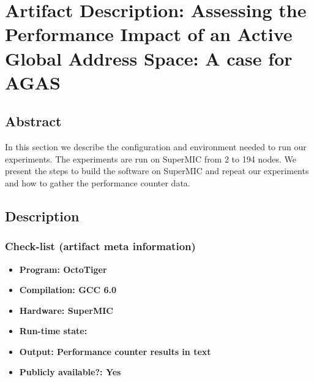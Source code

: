 \section{Artifact Description: Assessing the Performance Impact of an Active Global Address Space: A case for AGAS}


\subsection{Abstract}

In this section we describe the configuration and environment needed to run our experiments. The experiments are run on SuperMIC\cite{smic_info} from 2 to 194 nodes. We present the steps to build the software on SuperMIC and repeat our experiments and how to gather the performance counter data.

\subsection{Description}

\subsubsection{Check-list (artifact meta information)}


{\small
\begin{itemize}
  \item {\bf Program: OctoTiger}
  \item {\bf Compilation: GCC 6.0}
  \item {\bf Hardware: SuperMIC}
  \item {\bf Run-time state: }
  \item {\bf Output: Performance counter results in text}
  \item {\bf Publicly available?: Yes}
\end{itemize}
}

